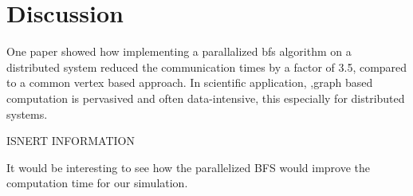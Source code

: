 \chapter{Discussion}
One paper showed how implementing a parallalized bfs algorithm on a distributed system reduced the communication times by a factor of 3.5, compared to a common vertex based approach\cite{ParallelBFS2011}.  In scientific application, ,graph based computation is pervasived and often data-intensive, this especially for distributed systems. 

ISNERT INFORMATION 


It would be interesting to see how the parallelized BFS would improve the computation time for our simulation.